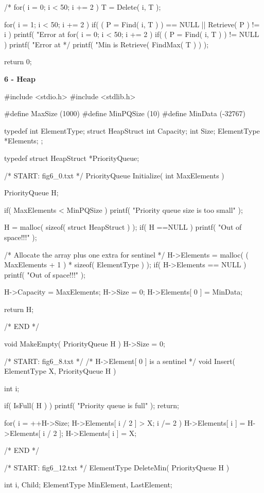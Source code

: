 \documentclass[12pt, a4paper]{article}
\begin{document}
\begin{code}
{ /* for( i = 0; i < 50; i += 2 )
        T = Delete( i, T );

    for( i = 1; i < 50; i += 2 )
        if( ( P = Find( i, T ) ) == NULL || Retrieve( P ) != i )
            printf( "Error at %
    for( i = 0; i < 50; i += 2 )
        if( ( P = Find( i, T ) ) != NULL )
            printf( "Error at %
*/
    printf( "Min is %
               Retrieve( FindMax( T ) ) );

    return 0;
}
\end{code}
\pagebreak

\huge\textbf{6 - Heap} 
\begin{code}
#include <stdio.h>
#include <stdlib.h>

#define MaxSize (1000)
#define MinPQSize (10)
#define MinData (-32767)

typedef int ElementType;
struct HeapStruct
{
	int Capacity;
	int Size;
	ElementType *Elements;
};
        
typedef struct HeapStruct *PriorityQueue;

/* START: fig6_0.txt */
PriorityQueue Initialize( int MaxElements )
{
	PriorityQueue H;

	if( MaxElements < MinPQSize )
		printf( "Priority queue size is too small" );

	H = malloc( sizeof( struct HeapStruct ) );
	if( H ==NULL )
		printf( "Out of space!!!" );

	/* Allocate the array plus one extra for sentinel */
	H->Elements = malloc( ( MaxElements + 1 ) * sizeof( ElementType ) );
	if( H->Elements == NULL )
		printf( "Out of space!!!" );

	H->Capacity = MaxElements;
	H->Size = 0;
	H->Elements[ 0 ] = MinData;

	return H;
}
/* END */

void MakeEmpty( PriorityQueue H )
{
	H->Size = 0;
}

/* START: fig6_8.txt */
/* H->Element[ 0 ] is a sentinel */
void Insert( ElementType X, PriorityQueue H )
{
	int i;

	if( IsFull( H ) )
	{
		printf( "Priority queue is full" );
		return;
	}

	for( i = ++H->Size; H->Elements[ i / 2 ] > X; i /= 2 )
		H->Elements[ i ] = H->Elements[ i / 2 ];
	H->Elements[ i ] = X;
}
/* END */

/* START: fig6_12.txt */
ElementType DeleteMin( PriorityQueue H )
{
	int i, Child;
	ElementType MinElement, LastElement;

}
\end{code}
\end{document}
